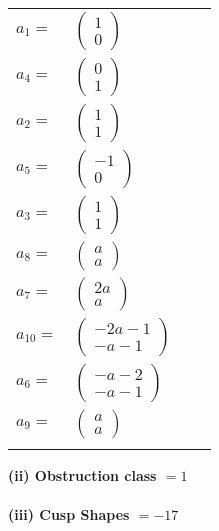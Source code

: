 \documentclass[1p]{elsarticle_modified}
\theoremstyle{definition}
\begin{document}
\begin{tabular}{m{7pt} m{180pt} m{7pt} m{180pt} }
\flushright $a_{1}=$&$\begin{pmatrix}1\\0\end{pmatrix}$ \\
\flushright $a_{4}=$&$\begin{pmatrix}0\\1\end{pmatrix}$ \\
\flushright $a_{2}=$&$\begin{pmatrix}1\\1\end{pmatrix}$ \\
\flushright $a_{5}=$&$\begin{pmatrix}-1\\0\end{pmatrix}$ \\
\flushright $a_{3}=$&$\begin{pmatrix}1\\1\end{pmatrix}$ \\
\flushright $a_{8}=$&$\begin{pmatrix}a\\a\end{pmatrix}$ \\
\flushright $a_{7}=$&$\begin{pmatrix}2 a\\a\end{pmatrix}$ \\
\flushright $a_{10}=$&$\begin{pmatrix}-2 a-1\\- a-1\end{pmatrix}$ \\
\flushright $a_{6}=$&$\begin{pmatrix}- a-2\\- a-1\end{pmatrix}$ \\
\flushright $a_{9}=$&$\begin{pmatrix}a\\a\end{pmatrix}$\\&\end{tabular}
\flushleft \textbf{(ii) Obstruction class $= 1$}\\~\\
\flushleft \textbf{(iii) Cusp Shapes $= -17$}\\~\\
\end{document}
